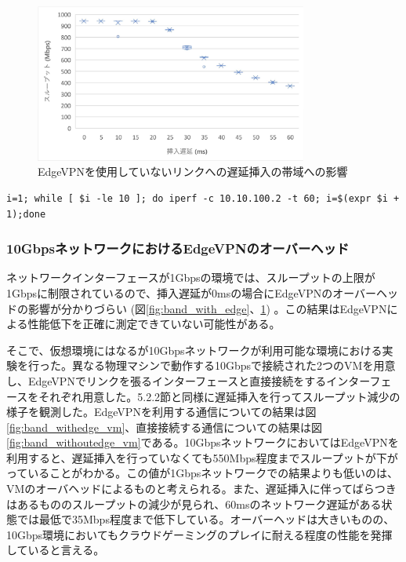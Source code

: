 \begin{figure}[h!]
    \centering
    \includegraphics[width=0.8\textwidth,keepaspectratio,clip]{img/bandwidth_withoutEdgeVPN.pdf}
    \caption{EdgeVPNを使用していないリンクへの遅延挿入の帯域への影響}
    \label{fig:band_without_edge}
\end{figure}

\begin{lstlisting}[caption=帯域計測,label=measure_band]
    i=1; while [ $i -le 10 ]; do iperf -c 10.10.100.2 -t 60; i=$(expr $i + 1);done
\end{lstlisting}

\subsubsection{10GbpsネットワークにおけるEdgeVPNのオーバーヘッド}
ネットワークインターフェースが1Gbpsの環境では、スループットの上限が1Gbpsに制限されているので、挿入遅延が0msの場合にEdgeVPNのオーバーヘッドの影響が分かりづらい (図\ref{fig:band_with_edge}、\ref{fig:band_without_edge}) 。この結果はEdgeVPNによる性能低下を正確に測定できていない可能性がある。

そこで、仮想環境にはなるが10Gbpsネットワークが利用可能な環境における実験を行った。異なる物理マシンで動作する10Gbpsで接続された2つのVMを用意し、EdgeVPNでリンクを張るインターフェースと直接接続をするインターフェースをそれぞれ用意した。5.2.2節と同様に遅延挿入を行ってスループット減少の様子を観測した。EdgeVPNを利用する通信についての結果は図\ref{fig:band_withedge_vm}、直接接続する通信についての結果は図\ref{fig:band_withoutedge_vm}である。10GbpsネットワークにおいてはEdgeVPNを利用すると、遅延挿入を行っていなくても550Mbps程度までスループットが下がっていることがわかる。この値が1Gbpsネットワークでの結果よりも低いのは、VMのオーバヘッドによるものと考えられる。また、遅延挿入に伴ってばらつきはあるもののスループットの減少が見られ、60msのネットワーク遅延がある状態では最低で35Mbps程度まで低下している。オーバーヘッドは大きいものの、10Gbps環境においてもクラウドゲーミングのプレイに耐える程度の性能を発揮していると言える。


